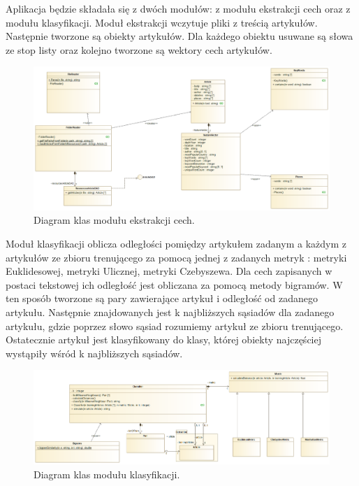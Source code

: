 \documentclass{classrep}
\begin{document}
Aplikacja będzie składała się z dwóch modułów: z modułu ekstrakcji cech oraz z modułu klasyfikacji. Moduł ekstrakcji wczytuje pliki z treścią artykułów. Następnie tworzone są obiekty artykułów. Dla każdego obiektu usuwane są słowa ze stop listy oraz kolejno tworzone są wektory cech artykułów. 

\begin{figure}[h!]
 \centering
 \includegraphics[width=14cm]{Ekstrakcja.png}
 \vspace{-0.3cm}
 \caption{Diagram klas modułu ekstrakcji cech. }
 \label{rysunek do eksperymentu 1 wariantu 1}
\end{figure}
\newpage

Moduł klasyfikacji oblicza odległości pomiędzy artykułem zadanym a każdym z artykułów ze zbioru trenującego za pomocą jednej z zadanych metryk \cite{dane} : metryki Euklidesowej, metryki Ulicznej, metryki Czebyszewa. Dla cech zapisanych w postaci tekstowej ich odległość jest obliczana za pomocą metody bigramów. W ten sposób tworzone są pary zawierające artykuł i odległość od zadanego artykułu. Następnie znajdowanych jest k najbliższych sąsiadów dla zadanego artykułu, gdzie poprzez słowo sąsiad rozumiemy artykuł ze zbioru trenującego. Ostatecznie artykuł jest klasyfikowany do klasy, której obiekty najczęściej wystąpiły wśród k najbliższych sąsiadów. 

\begin{figure}[h!]
 \centering
 \includegraphics[width=14cm]{Klasyfikator.png}
 \vspace{-0.3cm}
 \caption{Diagram klas modułu klasyfikacji. }
 \label{rysunek do eksperymentu 1 wariantu 1}
\end{figure}
\end{document}
